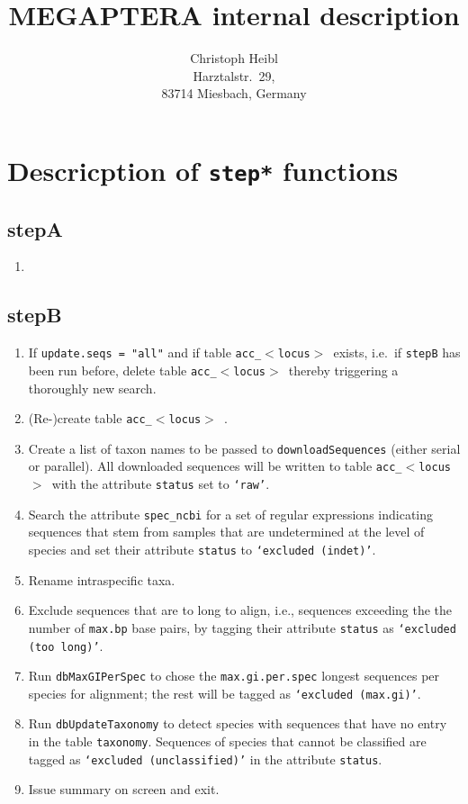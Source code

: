 \documentclass[12pt]{article}
\title{MEGAPTERA internal description}
\author{Christoph Heibl\\Harztalstr.~29,\\83714 Miesbach, Germany}
\newcommand{\acctab}{table \texttt{acc\_$<$locus$>$ }}
\begin{document}
\maketitle
\tableofcontents

\section{Descricption of \texttt{step*} functions}

\subsection{stepA}

\begin{enumerate}
\item 
\end{enumerate}

\subsection{stepB}

\begin{enumerate}
\item If \texttt{update.seqs = "all"} and if \acctab exists, i.e.~if \texttt{stepB} has been run before, delete \acctab thereby triggering a thoroughly new search.

\item (Re-)create \acctab.

\item Create a list of taxon names to be passed to \texttt{downloadSequences} (either serial or parallel). All downloaded sequences will be written to \acctab with the attribute \texttt{status} set to \texttt{`raw'}.

\item Search the attribute \texttt{spec\_ncbi} for a set of regular expressions indicating sequences that stem from samples that are undetermined at the level of species and set their attribute \texttt{status} to \texttt{`excluded (indet)'}.

\item Rename intraspecific taxa.

\item Exclude sequences that are to long to align, i.e., sequences exceeding the the number of \texttt{max.bp} base pairs, by tagging their attribute \texttt{status} as \texttt{`excluded (too long)'}.

\item Run \texttt{dbMaxGIPerSpec} to chose the \texttt{max.gi.per.spec} longest sequences per species for alignment; the rest will be tagged as \texttt{`excluded (max.gi)'}.

\item Run \texttt{dbUpdateTaxonomy} to detect species with sequences that have no entry in the table \texttt{taxonomy}. Sequences of species that cannot be classified are tagged as \texttt{`excluded (unclassified)'} in the attribute \texttt{status}.

\item Issue summary on screen and exit.
\end{enumerate}
\end{document}
